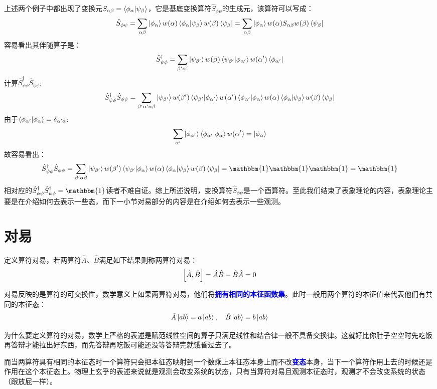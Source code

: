 上述两个例子中都出现了变换元$S_{\alpha\beta}=\bra{\phi_{\alpha}}\ket{\psi_{\beta}}$，它是基底变换算符$\hat{S}_{\phi\psi}$的生成元，该算符可以写成：
\[\hat{S}_{\phi\psi}=\sum_{\alpha\beta}\ket{\phi_{\alpha}}w(\alpha)\bra{\phi_{\alpha}}\ket{\psi_{\beta}}w(\beta)\bra{\psi_{\beta}}=\sum_{\alpha\beta}\ket{\phi_{\alpha}}w(\alpha)S_{\alpha\beta}w(\beta)\bra{\psi_{\beta}}\]
容易看出其伴随算子是：
\[\hat{S}_{\psi\phi}^{\dagger}=\sum_{\beta'\alpha'}\ket{\psi_{\beta'}}w(\beta)\bra{\psi_{\beta'}}\ket{\phi_{\alpha'}}w(\alpha')\bra{\phi_{\alpha'}}\]
计算$\hat{S}_{\psi\phi}^{\dagger}\hat{S}_{\phi\psi}$:
\[\hat{S}_{\psi\phi}^{\dagger}\hat{S}_{\phi\psi}=\sum_{\beta'\alpha'\alpha\beta}\ket{\psi_{\beta'}}w(\beta')\bra{\psi_{\beta'}}\ket{\phi_{\alpha'}}w(\alpha')\bra{\phi_{\alpha'}}\ket{\phi_{\alpha}}w(\alpha)\bra{\phi_{\alpha}}\ket{\psi_{\beta}}w(\beta)\bra{\psi_{\beta}}\]
由于$\bra{\phi_{\alpha'}}\ket{\phi_{\alpha}}=\delta_{\alpha'\alpha}$:
\[\sum_{\alpha'}\ket{\phi_{\alpha'}}\bra{\phi_{\alpha'}}\ket{\phi_{\alpha}}w(\alpha')=\ket{\phi_{\alpha}}\]
故容易看出：
\[\hat{S}_{\psi\phi}^{\dagger}\hat{S}_{\phi\psi}=\sum_{\beta'\alpha\beta}\ket{\psi_{\beta'}}w(\beta')\bra{\psi_{\beta'}}\ket{\phi_{\alpha}}w(\alpha)\bra{\phi_{\alpha}}\ket{\psi_{\beta}}w(\beta)\bra{\psi_{\beta}}=\mathbbm{1}\mathbbm{1}\mathbbm{1}=\mathbbm{1}\]
相对应的$\hat{S}_{\phi\psi}^{\dagger}\hat{S}_{\psi\phi}^{\dagger}=\mathbbm{1}$读者不难自证。综上所述说明，变换算符$\hat{S}_{\phi\psi}$是一个酉算符。至此我们结束了表象理论的内容，表象理论主要是在介绍如何去表示一些态，而下一小节对易部分的内容是在介绍如何去表示一些观测。

\section{对易}
定义算符对易，若两算符$\hat{A}$、$\hat{B}$满足如下结果则称两算符对易：
\[\comm{\hat{A}}{\hat{B}}=\hat{A}\hat{B}-\hat{B}\hat{A}=0\]

对易反映的是算符的可交换性，数学意义上如果两算符对易，他们将\textcolor{blue}{\textbf{拥有相同的本征函数集}}。此时一般用两个算符的本征值来代表他们有共同的本征态：
\[\hat{A}\ket{ab}=a\ket{ab}, \quad \hat{B}\ket{ab}=b\ket{ab}\]

为什么要定义算符的对易，数学上严格的表述是赋范线性空间的算子只满足线性和结合律一般不具备交换律。这就好比你肚子空空时先吃饭再答辩才能拉出好东西，而先答辩再吃饭可能还没等答辩完就饿昏过去了。

而当两算符具有相同的本征态时一个算符只会把本征态映射到一个数乘上本征态本身上而不改\textcolor{blue}{\textbf{变态}}本身，当下一个算符作用上去的时候还是作用在这个本征态上。物理上玄乎的表述来说就是观测会改变系统的状态，只有当算符对易且观测本征态时，观测才不会改变系统的状态（跟放屁一样）。

